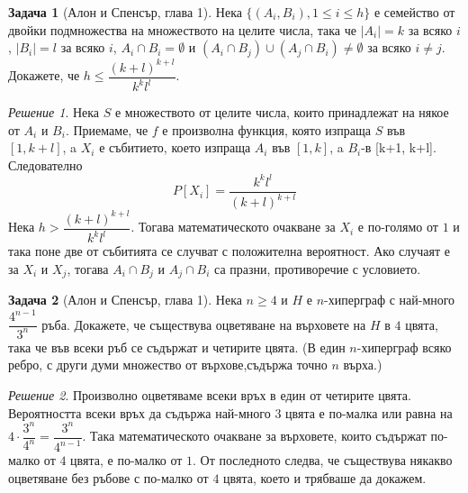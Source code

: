 \documentclass[11 pt, a4paper]{article}
\theoremstyle{definition}
\newtheorem{p}{Задача}
\theoremstyle{remark}
\newtheorem*{s}{Решение}
\begin{document}
\begin{p}[Алон и Спенсър, глава 1]
Нека $\big\{(A_i,B_i), 1\leq i\leq h \big\}$ е семейство от двойки подмножества на множеството на целите числа, така че $|A_i|=k$ за всяко $i$, $|B_i|=l$ за всяко $i$, $A_i\cap B_i= \emptyset$ и $(A_i\cap B_j)\cup(A_j\cap B_i)\neq \emptyset$ за всяко $i\neq j$. Докажете, че $h\leq\dfrac{(k+l)^{k+l}}{k^{k}l^{l}}$.
\end{p}
\begin{s}
Нека $S$ е множеството от целите числа, които принадлежат на някое от $A_i$ и $B_i$. Приемаме, че $f$ е произволна функция, която изпраща $S$ във $[1,k+l]$, a $X_i$ е събитието, което изпраща $A_i$ във $[1,k]$, a $B_i$-в [k+1, k+l]. Следователно
\begin{equation*}
 P[X_i]=\dfrac{k^k l^l}{(k+l)^{k+l}}   
\end{equation*}
Нека $h>\dfrac{(k+l)^{k+l}}{k^k l^l}$. Тогава математическото очакване за $X_i$ е по-голямо от $1$ и така поне две от събитията се случват с положителна вероятност. Ако случаят е за $X_i$ и $X_j$, тогава $A_i\cap B_j$ и $A_j\cap B_i$ са празни, противоречие с условието.
\end{s}


\begin{p}[Алон и Спенсър, глава 1]
Нека $n\geq4$ и $H$ е $n$-хиперграф с най-много $\dfrac{4^{n-1}}{3^n}$ ръба. Докажете, че съществува оцветяване на върховете на $H$ в $4$ цвята, така че във всеки ръб се съдържат и четирите цвята. (В един $n$-хиперграф всяко ребро, с други думи множество от върхове,съдържа точно $n$ върха.) 
\end{p}
\begin{s}
Произволно оцветяваме всеки връх в един от четирите цвята. Вероятността всеки връх да съдържа най-много $3$ цвята е по-малка или равна на $4\cdot\dfrac{3^n}{4^n}=\dfrac{3^n}{4^{n-1}}$. Така математическото очакване за върховете, които съдържат по-малко от $4$ цвята, е по-малко от $1$. От последното следва, че съществува някакво оцветяване без ръбове с по-малко от $4$ цвята, което и трябваше да докажем. 
\end{s}
\end{document}

